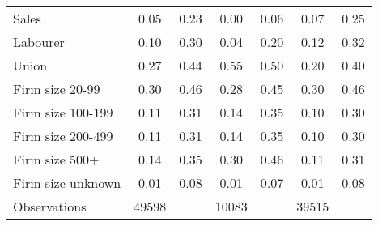 {\begin{tabular}{l*{3}{cc}}
Sales               &        0.05&        0.23&        0.00&        0.06&        0.07&        0.25\\
Labourer            &        0.10&        0.30&        0.04&        0.20&        0.12&        0.32\\
Union               &        0.27&        0.44&        0.55&        0.50&        0.20&        0.40\\
Firm size 20-99     &        0.30&        0.46&        0.28&        0.45&        0.30&        0.46\\
Firm size 100-199   &        0.11&        0.31&        0.14&        0.35&        0.10&        0.30\\
Firm size 200-499   &        0.11&        0.31&        0.14&        0.35&        0.10&        0.30\\
Firm size 500+      &        0.14&        0.35&        0.30&        0.46&        0.11&        0.31\\
Firm size unknown   &        0.01&        0.08&        0.01&        0.07&        0.01&        0.08\\
\hline
Observations        &       49598&            &       10083&            &       39515&            \\
\hline\hline
\end{tabular}
}
